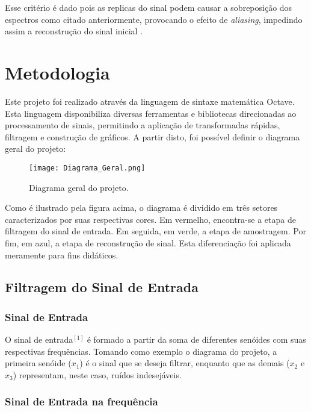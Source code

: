 \documentclass[journal]{IEEEtran}
\begin{document}
Esse critério é dado pois as replicas do sinal podem causar a sobreposição dos espectros como citado anteriormente, provocando o efeito de \textit{aliasing}, impedindo assim a reconstrução do sinal inicial \cite{alan}.

\section{Metodologia}

Este projeto foi realizado através da linguagem de sintaxe matemática Octave. Esta linguagem disponibiliza diversas ferramentas e bibliotecas direcionadas ao processamento de sinais, permitindo a aplicação de transformadas rápidas, filtragem e construção de gráficos. A partir disto, foi possível definir o diagrama geral do projeto:

\begin{figure}[H]
\captionsetup{justification=centering}
\centering %
\texttt{[image: Diagrama\_Geral.png]} %
\caption{Diagrama geral do projeto.}
\end{figure}

Como é ilustrado pela figura acima, o diagrama é dividido em três setores caracterizados por suas respectivas cores. Em vermelho, encontra-se a etapa de filtragem do sinal de entrada. Em seguida, em verde, a etapa de amostragem. Por fim, em azul, a etapa de reconstrução de sinal. Esta diferenciação foi aplicada meramente para fins didáticos. 

\subsection{Filtragem do Sinal de Entrada}

\subsubsection{Sinal de Entrada}

O sinal de entrada$^{[1]}$ é formado a partir da soma de diferentes senóides com suas respectivas frequências. Tomando como exemplo o diagrama do projeto, a primeira senóide ($x_1$) é o sinal que se deseja filtrar, enquanto que as demais ($x_2$ e $x_3$) representam, neste caso, ruídos indesejáveis. 

\subsubsection{Sinal de Entrada na frequência}
\end{document}
